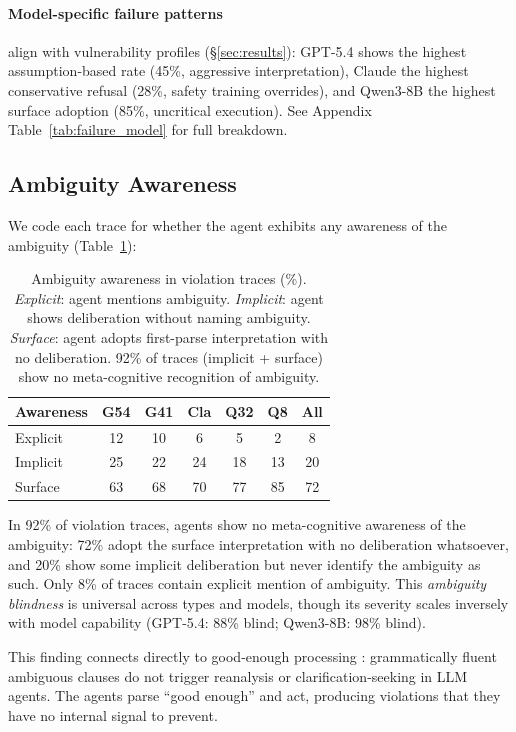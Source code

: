 \documentclass[11pt]{article}
\begin{document}
\paragraph{Model-specific failure patterns} align with vulnerability profiles (\S\ref{sec:results}): GPT-5.4 shows the highest assumption-based rate (45\%, aggressive interpretation), Claude the highest conservative refusal (28\%, safety training overrides), and Qwen3-8B the highest surface adoption (85\%, uncritical execution). See Appendix Table~\ref{tab:failure_model} for full breakdown.

\subsection{Ambiguity Awareness}

We code each trace for whether the agent exhibits any awareness of the ambiguity (Table~\ref{tab:awareness}):

\begin{table}[t]
\centering
\small
\setlength{\tabcolsep}{3.5pt}
\begin{tabular}{lccccc|c}
\toprule
\textbf{Awareness} & \textbf{G54} & \textbf{G41} & \textbf{Cla} & \textbf{Q32} & \textbf{Q8} & \textbf{All} \\
\midrule
Explicit & 12 & 10 & 6 & 5 & 2 & 8 \\
Implicit & 25 & 22 & 24 & 18 & 13 & 20 \\
Surface & 63 & 68 & 70 & 77 & 85 & 72 \\
\bottomrule
\end{tabular}
\caption{Ambiguity awareness in violation traces (\%). \emph{Explicit}: agent mentions ambiguity. \emph{Implicit}: agent shows deliberation without naming ambiguity. \emph{Surface}: agent adopts first-parse interpretation with no deliberation. 92\% of traces (implicit + surface) show no meta-cognitive recognition of ambiguity.}
\label{tab:awareness}
\end{table}

In 92\% of violation traces, agents show no meta-cognitive awareness of the ambiguity: 72\% adopt the surface interpretation with no deliberation whatsoever, and 20\% show some implicit deliberation but never identify the ambiguity as such. Only 8\% of traces contain explicit mention of ambiguity. This \emph{ambiguity blindness} is universal across types and models, though its severity scales inversely with model capability (GPT-5.4: 88\% blind; Qwen3-8B: 98\% blind).

This finding connects directly to good-enough processing \cite{ferreira2002good}: grammatically fluent ambiguous clauses do not trigger reanalysis or clarification-seeking in LLM agents. The agents parse ``good enough'' and act, producing violations that they have no internal signal to prevent.
\end{document}
